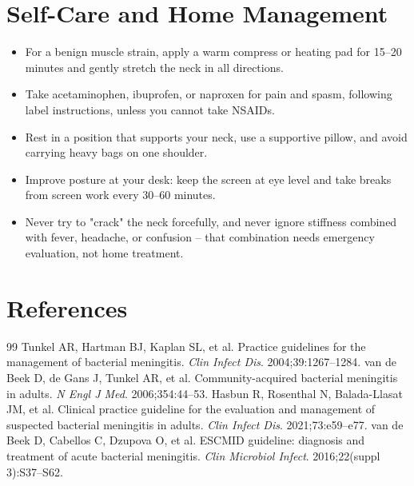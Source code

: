 \section*{Self-Care and Home Management}
\begin{itemize}
  \item For a benign muscle strain, apply a warm compress or heating pad for 15--20 minutes and gently stretch the neck in all directions.
  \item Take acetaminophen, ibuprofen, or naproxen for pain and spasm, following label instructions, unless you cannot take NSAIDs.
  \item Rest in a position that supports your neck, use a supportive pillow, and avoid carrying heavy bags on one shoulder.
  \item Improve posture at your desk: keep the screen at eye level and take breaks from screen work every 30--60 minutes.
  \item Never try to "crack" the neck forcefully, and never ignore stiffness combined with fever, headache, or confusion -- that combination needs emergency evaluation, not home treatment.
\end{itemize}

\section*{References}
\begin{thebibliography}{99}
 Tunkel AR, Hartman BJ, Kaplan SL, et al. Practice guidelines for the management of bacterial meningitis. \textit{Clin Infect Dis}. 2004;39:1267--1284.
 van de Beek D, de Gans J, Tunkel AR, et al. Community-acquired bacterial meningitis in adults. \textit{N Engl J Med}. 2006;354:44--53.
 Hasbun R, Rosenthal N, Balada-Llasat JM, et al. Clinical practice guideline for the evaluation and management of suspected bacterial meningitis in adults. \textit{Clin Infect Dis}. 2021;73:e59--e77.
 van de Beek D, Cabellos C, Dzupova O, et al. ESCMID guideline: diagnosis and treatment of acute bacterial meningitis. \textit{Clin Microbiol Infect}. 2016;22(suppl 3):S37--S62.
\end{thebibliography}
